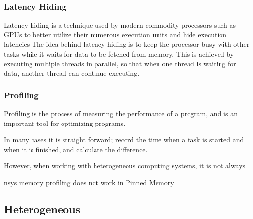 \subsubsection{Latency Hiding}
Latency hiding is a technique used by modern commodity processors such as GPUs to better utilize their numerous execution units and hide execution latencies \cite[35]{VolkovLatencyHiding2016}
The idea behind latency hiding is to keep the processor busy with other tasks while it waits for data to be fetched from memory.
This is achieved by executing multiple threads in parallel, so that when one thread is waiting for data, another thread can continue executing.


\subsubsection{Profiling}
Profiling is the process of measuring the performance of a program, and is an important tool for optimizing programs.

In many cases it is straight forward; record the time when a task is started and when it is finished, and calculate the difference.


However, when working with heterogeneous computing systems, it is not always

nsys memory profiling does not work in Pinned Memory

\subsection{Heterogeneous}
